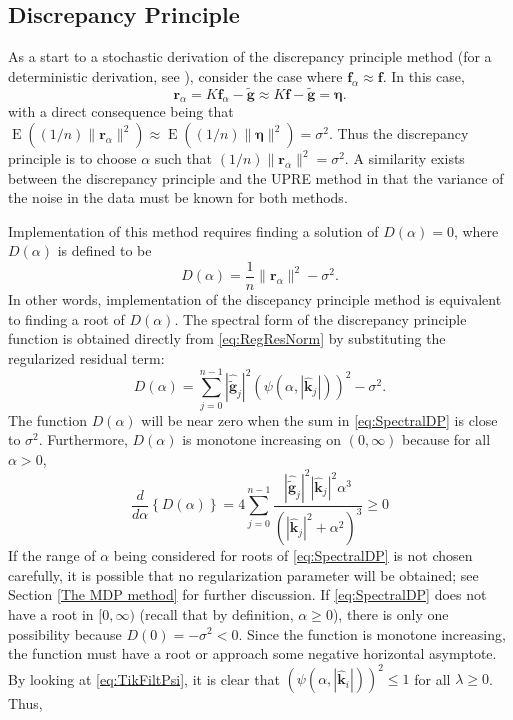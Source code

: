 \documentclass[12pt]{article}
\newcommand{\gnoise}{\widetilde{\mathbf{g}}}
\newcommand{\kdis}{\mathbf{k}}
\newcommand{\kmat}{K}	%
\newcommand{\fdis}{\mathbf{f}}
\newcommand{\regparam}{\alpha}
\newcommand{\freg}{\fdis_{\regparam}}	%
\newcommand{\mfilt}{\psi}
\newcommand{\noiseSD}{\sigma}	%
\newcommand{\noise}{\bm{\eta}}	%
\newcommand{\E}{\operatorname{E}}	%
\newcommand{\regres}{\mathbf{r}_{\regparam}}	%
\newcommand{\D}{D}	%
\begin{document}
\subsection{Discrepancy Principle} \label{sec:Discrepancy Principle}
As a start to a stochastic derivation of the discrepancy principle method (for a deterministic derivation, see \cite{Vogel:2002}), consider the case where $\freg \approx \fdis$. In this case,
\[\regres = \kmat\freg - \gnoise \approx \kmat\fdis - \gnoise = \noise.\]
with a direct consequence being that $\E((1/n)\|\regres\|^2) \approx \E((1/n)\|\noise\|^2) =\noiseSD^2$. Thus the discrepancy principle is to choose $\regparam$ such that $(1/n)\|\regres\|^2 = \noiseSD^2$. A similarity exists between the discrepancy principle and the UPRE method in that the variance of the noise in the data must be known for both methods. \par 
Implementation of this method requires finding a solution of $\D(\regparam) = 0$, where $\D(\regparam)$ is defined to be
\begin{equation}
\label{eq:DP}
\D(\regparam) = \frac{1}{n}\|\regres\|^2 - \noiseSD^2.
\end{equation}
In other words, implementation of the discepancy principle method is equivalent to finding a root of $\D(\regparam)$. The spectral form of the discrepancy principle function is obtained directly from \eqref{eq:RegResNorm} by substituting the regularized residual term:
\begin{equation}
\D(\regparam) = \sum_{j = 0}^{n-1} |\widehat{\gnoise}_j|^2(\mfilt(\regparam,|\widehat{\kdis}_j|))^2 - \noiseSD^2.
\label{eq:SpectralDP}
\end{equation}
The function $\D(\regparam)$ will be near zero when the sum in \eqref{eq:SpectralDP} is close to $\noiseSD^2$.  Furthermore, $\D(\regparam)$ is monotone increasing on $(0,\infty)$ because for all $\regparam > 0$,
\[\frac{d}{d\regparam}\left\{\D(\regparam)\right\} = 4\sum_{j = 0}^{n-1} \frac{|\widehat{\gnoise}_j|^2|\widehat{\kdis}_j|^2\regparam^3}{\left(|\widehat{\kdis}_j|^2 + \regparam^2\right)^3} \geq 0\]
If the range of $\regparam$ being considered for roots of \eqref{eq:SpectralDP} is not chosen carefully, it is possible that no regularization parameter will be obtained; see Section \ref{The MDP method} for further discussion. If \eqref{eq:SpectralDP} does not have a root in $[0,\infty)$ (recall that by definition, $\regparam \geq 0$), there is only one possibility because $\D(0) = -\noiseSD^2 < 0$. Since the function is monotone increasing, the function must have a root or approach some negative horizontal asymptote. By looking at \eqref{eq:TikFiltPsi}, it is clear that $(\mfilt(\regparam,|\widehat{\kdis}_i|))^2 \leq 1$ for all $\lambda \geq 0$. Thus,
\end{document}
